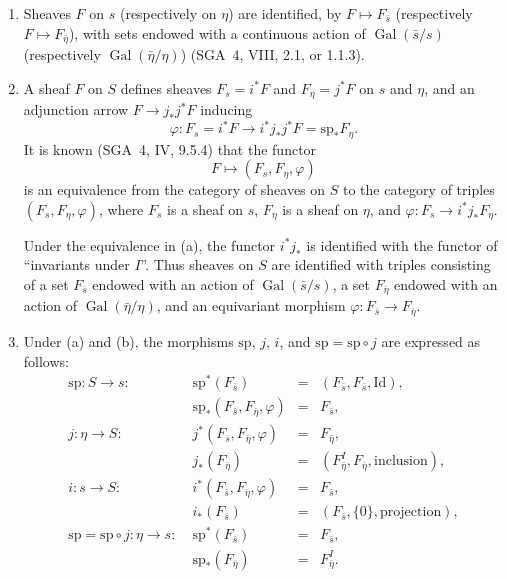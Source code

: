 \begin{enumerate}[label=(\alph*)]
\item Sheaves $F$ on $s$ (respectively on $\eta$) are identified, by
$F\mapsto F_{\bar s}$ (respectively $F\mapsto F_{\bar\eta}$), with
sets endowed with a continuous action of $\operatorname{Gal}(\bar s/s)$
(respectively $\operatorname{Gal}(\bar\eta/\eta)$) (SGA~4, VIII, 2.1,
or 1.1.3).

\item A sheaf $F$ on $S$ defines sheaves $F_s=i^*F$ and
$F_\eta=j^*F$ on $s$ and $\eta$, and an adjunction arrow
$F\longrightarrow j_*j^*F$ inducing
\begin{equation*}
\varphi:F_s=i^*F\longrightarrow i^*j_*j^*F
=\mathrm{sp}_*F_\eta.
\end{equation*}
It is known (SGA~4, IV, 9.5.4) that the functor
\begin{equation*}
F\longmapsto(F_s,F_\eta,\varphi)
\end{equation*}
is an equivalence from the category of sheaves on $S$ to the category
of triples $(F_s,F_\eta,\varphi)$, where $F_s$ is a sheaf on $s$,
$F_\eta$ is a sheaf on $\eta$, and
$\varphi:F_s\longrightarrow i^*j_*F_\eta$.

Under the equivalence in (a), the functor $i^*j_*$ is identified with
the functor of ``invariants under $I$''.  Thus sheaves on $S$ are
identified with triples consisting of a set $F_{\bar s}$ endowed with
an action of $\operatorname{Gal}(\bar s/s)$, a set $F_{\bar\eta}$
endowed with an action of $\operatorname{Gal}(\bar\eta/\eta)$, and an
equivariant morphism
$\varphi:F_{\bar s}\longrightarrow F_{\bar\eta}$.

\item Under (a) and (b), the morphisms $\mathrm{sp}$, $j$, $i$, and
$\mathrm{sp}=\mathrm{sp}\circ j$ are expressed as follows:
\begin{equation*}
\begin{array}{llcl}
\mathrm{sp}:S\longrightarrow s:\;&
 \mathrm{sp}^*(F_{\bar s})&=&(F_{\bar s},F_{\bar s},\mathrm{Id}),\\[2pt]
&\mathrm{sp}_*(F_{\bar s},F_{\bar\eta},\varphi)&=&F_{\bar s},\\[3pt]
j:\eta\longrightarrow S:\;&
 j^*(F_{\bar s},F_{\bar\eta},\varphi)&=&F_{\bar\eta},\\[2pt]
&j_*(F_{\bar\eta})&=&(F_{\bar\eta}^{I},F_{\bar\eta},
 \text{inclusion}),\\[3pt]
i:s\longrightarrow S:\;&
 i^*(F_{\bar s},F_{\bar\eta},\varphi)&=&F_{\bar s},\\[2pt]
&i_*(F_{\bar s})&=&(F_{\bar s},\{0\},\text{projection}),\\[3pt]
\mathrm{sp}=\mathrm{sp}\circ j:\eta\longrightarrow s:\;&
 \mathrm{sp}^*(F_{\bar s})&=&F_{\bar s},\\[2pt]
&\mathrm{sp}_*(F_{\bar\eta})&=&F_{\bar\eta}^{I}.
\end{array}
\end{equation*}
\end{enumerate}

